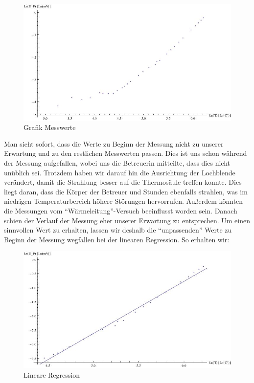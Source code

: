 \documentclass[12pt,twoside,a4paper]{article}
\begin{document}
\begin{figure}[H]
		\centering
		\includegraphics[scale=.6]{bilder/s_b_1.jpeg} 
		\caption{Grafik Messwerte}
	\end{figure}
	
Man sieht sofort, dass die Werte zu Beginn der Messung nicht zu unserer Erwartung und zu den restlichen Messwerten passen. Dies ist uns schon während der Messung aufgefallen, wobei uns die Betreuerin mitteilte, dass dies nicht unüblich sei. Trotzdem haben wir darauf hin die Ausrichtung der Lochblende verändert, damit die Strahlung besser auf die Thermosäule treffen konnte. Dies liegt daran, dass die Körper der Betreuer und Stunden ebenfalls strahlen, was im niedrigen Temperaturbereich höhere Störungen hervorrufen. Außerdem könnten die Messungen vom "`Wärmeleitung"'-Versuch beeinflusst worden sein. Danach schien der Verlauf der Messung eher unserer Erwartung zu entsprechen. Um einen sinnvollen Wert zu erhalten, lassen wir deshalb die "`unpassenden"' Werte zu Beginn der Messung wegfallen bei der linearen Regression. So erhalten wir:

\begin{figure}[H]
		\centering
		\includegraphics[scale=.6]{bilder/s_b_2.jpeg} 
		\caption{Lineare Regression}
	\end{figure}
\end{document}
